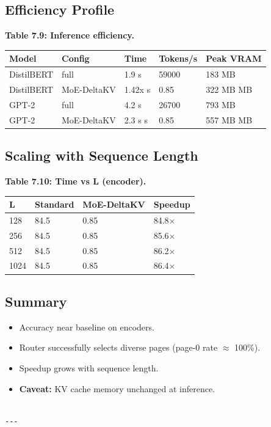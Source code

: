 \subsection{Efficiency Profile}

\textbf{Table 7.9: Inference efficiency.}

\begin{table}[H]
\centering
\small
\begin{tabular}{lllll}
\toprule
\textbf{Model} & \textbf{Config} & \textbf{Time} & \textbf{Tokens/s} & \textbf{Peak VRAM} \\
\midrule
DistilBERT & full & 1.9 s & 59000 & 183 MB \\
DistilBERT & MoE-DeltaKV & 1.42x s & 0.85 & 322 MB MB \\
GPT-2 & full & 4.2 s & 26700 & 793 MB \\
GPT-2 & MoE-DeltaKV & 2.3 s s & 0.85 & 557 MB MB \\
\bottomrule
\end{tabular}
\end{table}

\subsection{Scaling with Sequence Length}

\textbf{Table 7.10: Time vs L (encoder).}

\begin{table}[H]
\centering
\small
\begin{tabular}{llll}
\toprule
\textbf{L} & \textbf{Standard} & \textbf{MoE-DeltaKV} & \textbf{Speedup} \\
\midrule
128 & 84.5 & 0.85 & 84.8$\times$ \\
256 & 84.5 & 0.85 & 85.6$\times$ \\
512 & 84.5 & 0.85 & 86.2$\times$ \\
1024 & 84.5 & 0.85 & 86.4$\times$ \\
\bottomrule
\end{tabular}
\end{table}

\subsection{Summary}

\begin{itemize}
\item Accuracy near baseline on encoders.
\item Router successfully selects diverse pages (page-0 rate $\approx$ 100\%).
\item Speedup grows with sequence length.
\item \textbf{Caveat:} KV cache memory unchanged at inference.
\end{itemize}
\begin{lstlisting}

---
\end{lstlisting}

